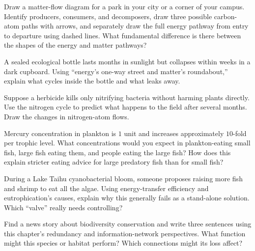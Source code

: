 \begin{sikaoti}
\item Draw a matter-flow diagram for a park in your city or a corner of your campus. Identify producers, consumers, and decomposers, draw three possible carbon-atom paths with arrows, and separately draw the full energy pathway from entry to departure using dashed lines. What fundamental difference is there between the shapes of the energy and matter pathways?
\item A sealed ecological bottle lasts months in sunlight but collapses within weeks in a dark cupboard. Using ``energy's one-way street and matter's roundabout,'' explain what cycles inside the bottle and what leaks away.
\item Suppose a herbicide kills only nitrifying bacteria without harming plants directly. Use the nitrogen cycle to predict what happens to the field after several months. Draw the changes in nitrogen-atom flows.
\item Mercury concentration in plankton is $1$ unit and increases approximately $10$-fold per trophic level. What concentrations would you expect in plankton-eating small fish, large fish eating them, and people eating the large fish? How does this explain stricter eating advice for large predatory fish than for small fish?
\item During a Lake Taihu cyanobacterial bloom, someone proposes raising more fish and shrimp to eat all the algae. Using energy-transfer efficiency and eutrophication's causes, explain why this generally fails as a stand-alone solution. Which ``valve'' really needs controlling?
\item Find a news story about biodiversity conservation and write three sentences using this chapter's redundancy and information-network perspectives. What function might this species or habitat perform? Which connections might its loss affect?
\end{sikaoti}
